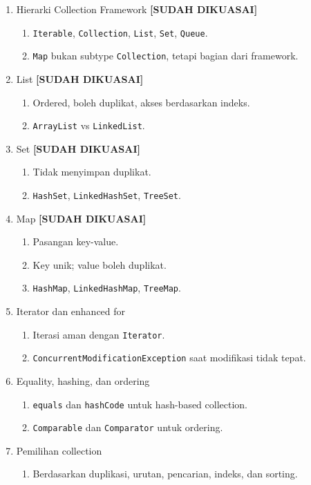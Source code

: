 \begin{enumerate}
    \item Hierarki Collection Framework \textbf{[SUDAH DIKUASAI]}
    \begin{enumerate}
        \item \texttt{Iterable}, \texttt{Collection}, \texttt{List}, \texttt{Set}, \texttt{Queue}.
        \item \texttt{Map} bukan subtype \texttt{Collection}, tetapi bagian dari framework.
    \end{enumerate}
    \item List \textbf{[SUDAH DIKUASAI]}
    \begin{enumerate}
        \item Ordered, boleh duplikat, akses berdasarkan indeks.
        \item \texttt{ArrayList} vs \texttt{LinkedList}.
    \end{enumerate}
    \item Set \textbf{[SUDAH DIKUASAI]}
    \begin{enumerate}
        \item Tidak menyimpan duplikat.
        \item \texttt{HashSet}, \texttt{LinkedHashSet}, \texttt{TreeSet}.
    \end{enumerate}
    \item Map \textbf{[SUDAH DIKUASAI]}
    \begin{enumerate}
        \item Pasangan key-value.
        \item Key unik; value boleh duplikat.
        \item \texttt{HashMap}, \texttt{LinkedHashMap}, \texttt{TreeMap}.
    \end{enumerate}
    \item Iterator dan enhanced for
    \begin{enumerate}
        \item Iterasi aman dengan \texttt{Iterator}.
        \item \texttt{ConcurrentModificationException} saat modifikasi tidak tepat.
    \end{enumerate}
    \item Equality, hashing, dan ordering
    \begin{enumerate}
        \item \texttt{equals} dan \texttt{hashCode} untuk hash-based collection.
        \item \texttt{Comparable} dan \texttt{Comparator} untuk ordering.
    \end{enumerate}
    \item Pemilihan collection
    \begin{enumerate}
        \item Berdasarkan duplikasi, urutan, pencarian, indeks, dan sorting.
    \end{enumerate}
\end{enumerate}


